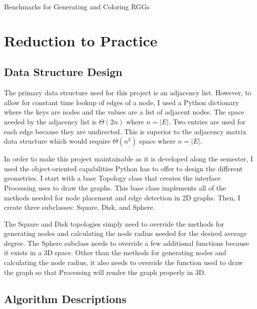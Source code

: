 \documentclass{article}
\begin{document}
    \begin{center}
        \begin{table}
            \centering
            \caption{Benchmarks for Generating and Coloring RGGs}
            \label{tab1}
        \end{table}
    \end{center}

\section{Reduction to Practice}

    \subsection{Data Structure Design}
    The primary data structure used for this project is an adjacency list. However, to allow for constant time lookup of edges of a node, I used a Python dictionary where the keys are nodes and the values are a list of adjacent nodes. The space needed by the adjacency list is $\Theta(2n)$ where $n = |E|$. Two entries are used for each edge because they are undirected. This is superior to the adjacency matrix data structure which would require $\Theta(n^2)$ space where $n = |E|$.
    \par
    In order to make this project maintainable as it is developed along the semester, I used the object-oriented capabilities Python has to offer to design the different geometries. I start with a base Topology class that creates the interface Processing uses to draw the graphs. This base class implements all of the methods needed for node placement and edge detection in 2D graphs. Then, I create three subclasses: Square, Disk, and Sphere.
    \par
    The Square and Disk topologies simply need to override the methods for generating nodes and calculating the node radius needed for the desired average degree. The Sphere subclass needs to override a few additional functions because it exists in a 3D space. Other than the methods for generating nodes and calculating the node radius, it also needs to override the function used to draw the graph so that Processing will render the graph properly in 3D.

    \subsection{Algorithm Descriptions}
\end{document}
